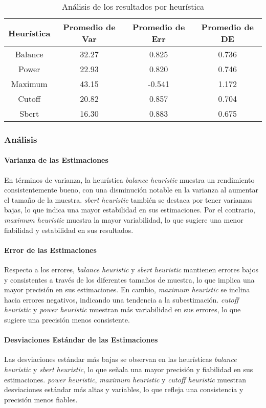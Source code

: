 \documentclass{article}
\begin{document}
\begin{table}[H]
\centering
\label{table:heuristic_analysis}
\begin{tabular}{|c|c|c|c|}
\hline
\textbf{Heurística} & \textbf{Promedio de Var} & \textbf{Promedio de Err} & \textbf{Promedio de DE} \\ \hline
Balance & 32.27 & 0.825 & 0.736 \\ \hline
Power & 22.93 & 0.820 & 0.746 \\ \hline
Maximum & 43.15 & -0.541 & 1.172 \\ \hline
Cutoff & 20.82 & 0.857 & 0.704 \\ \hline
Sbert & 16.30 & 0.883 & 0.675 \\ \hline
\end{tabular}
\caption{Análisis de los resultados por heurística}
\end{table}


\subsubsection{Análisis}

\paragraph{Varianza de las Estimaciones}
En términos de varianza, la heurística \textit{balance heuristic} muestra un rendimiento consistentemente bueno, con una disminución notable en la varianza al aumentar el tamaño de la muestra. \textit{sbert heuristic} también se destaca por tener varianzas bajas, lo que indica una mayor estabilidad en sus estimaciones. Por el contrario, \textit{maximum heuristic} muestra la mayor variabilidad, lo que sugiere una menor fiabilidad y estabilidad en sus resultados.


\paragraph{Error de las Estimaciones}
Respecto a los errores, \textit{balance heuristic} y \textit{sbert heuristic} mantienen errores bajos y consistentes a través de los diferentes tamaños de muestra, lo que implica una mayor precisión en sus estimaciones. En cambio, \textit{maximum heuristic} se inclina hacia errores negativos, indicando una tendencia a la subestimación. \textit{cutoff heuristic} y \textit{power heuristic} muestran más variabilidad en sus errores, lo que sugiere una precisión menos consistente.

\paragraph{Desviaciones Estándar de las Estimaciones}
Las desviaciones estándar más bajas se observan en las heurísticas \textit{balance heuristic} y \textit{sbert heuristic}, lo que señala una mayor precisión y fiabilidad en sus estimaciones. \textit{power heuristic}, \textit{maximum heuristic} y \textit{cutoff heuristic} muestran desviaciones estándar más altas y variables, lo que refleja una consistencia y precisión menos fiables.
\end{document}
